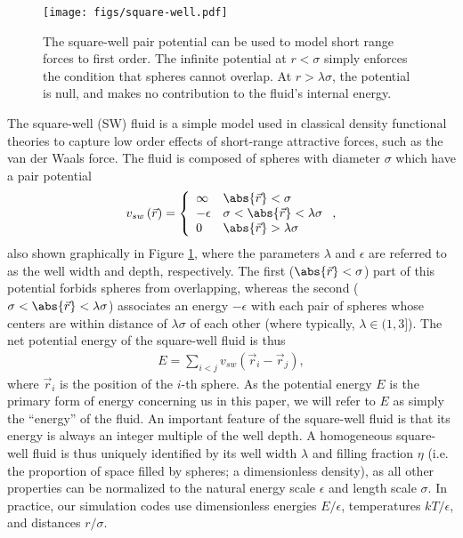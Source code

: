 \documentclass[11pt]{article}
\newcommand{\p}[1]{\left(#1\right)} %
\begin{document}
\begin{figure}[tb]
  \centering
  \texttt{[image: figs/square-well.pdf]}
  \caption[The square-well pair potential]
  {The square-well pair potential can be used to model short range
    forces to first order. The infinite potential at $r<\sigma$ simply
    enforces the condition that spheres cannot overlap. At
    $r>\lambda\sigma$, the potential is null, and makes no
    contribution to the fluid's internal energy.}
  \label{fig:pair_potential}
\end{figure}

The square-well (SW) fluid is a simple model used in classical density
functional theories to capture low order effects of short-range
attractive forces, such as the van der Waals force. The fluid is
composed of spheres with diameter $\sigma$ which have a pair potential
\begin{align}
  v_{sw}\p{\vec r}=\left\{
    \begin{array}{ll}
      \infty & \abs{\vec r}<\sigma \\
      -\epsilon & \sigma<\abs{\vec r}<\lambda\sigma \\
      0 & \abs{\vec r}>\lambda\sigma
    \end{array}
  \right., \label{eq:pair_potential}
\end{align}
also shown graphically in Figure \ref{fig:pair_potential}, where the
parameters $\lambda$ and $\epsilon$ are referred to as the well width
and depth, respectively. The first ($\abs{\vec r}<\sigma$) part of
this potential forbids spheres from overlapping, whereas the second
($\sigma<\abs{\vec r}<\lambda\sigma$) associates an energy $-\epsilon$
with each pair of spheres whose centers are within distance of
$\lambda\sigma$ of each other (where typically, $\lambda\in(1,3]$).
The net potential energy of the square-well fluid is thus
\begin{align}
  E=\sum_{i<j}v_{sw}\p{\vec r_i-\vec r_j},
  \label{eq:internal_energy}
\end{align}
where $\vec r_i$ is the position of the $i$-th sphere. As the
potential energy $E$ is the primary form of energy concerning us in
this paper, we will refer to $E$ as simply the ``energy'' of the
fluid. An important feature of the square-well fluid is that its
energy is always an integer multiple of the well depth. A homogeneous
square-well fluid is thus uniquely identified by its well width
$\lambda$ and filling fraction $\eta$ (i.e. the proportion of space
filled by spheres; a dimensionless density), as all other properties
can be normalized to the natural energy scale $\epsilon$ and length
scale $\sigma$. In practice, our simulation codes use dimensionless
energies $E/\epsilon$, temperatures $kT/\epsilon$, and distances
$r/\sigma$.
\end{document}
